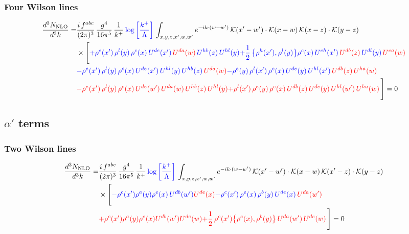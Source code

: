 \documentclass[9pt]{article}
\numberwithin{equation}{section}
\begin{document}
\subsubsection{Four Wilson lines}
\begin{align}
\frac{d^{3}N_{\rm NLO}}{d^{3}k} = &\frac{i\,f^{abc}}{(2\pi)^{3}}\,\frac{g^{4}}{16\pi^{5}}\,\frac{1}{k^{+}}\,{\color{blue}\log{\left[\frac{k^{+}}{\Lambda}\right]}}\,\int_{x,y,z,x',w,w'}e^{-ik\cdot (w-w')}\,\mathcal{K}(x'-w')\cdot\mathcal{K}(x-w)\,\mathcal{K}(x-z)\cdot\mathcal{K}(y-z)\notag\\
&\times\Bigg[{\color{blue}+\rho^{e}(x')\, \rho^{l}(y)\,\rho^{c}(x)\, U^{de}(x')\,{\color{red}U^{da}(w)}\,U^{hb}(z)\,U^{hl}(y)}{\color{blue}+\frac{1}{2}\,\big\{\rho^{h}(x'),\rho^{l}(y)\big\}\rho^{c}(x)\,U^{eh}(x')\,{\color{red}U^{db}(z)}\,U^{dl}(y)\,{\color{red}U^{ea}(w)}}\notag \\
&{\color{blue}-\rho^{e}(x')\,\rho^{l}(y)\,\rho^{c}(x)\,U^{de}(x')\,U^{hl}(y)\,U^{hb}(z)\,{\color{red}U^{da}(w)}}{\color{blue}-\rho^{e}(y)\,\rho^{l}(x')\,\rho^{c}(x)\,U^{de}(y)\,U^{hl}(x')\,{\color{red}U^{db}(z)}\,{\color{red}U^{ha}(w)}} \notag \\ &{\color{red}-\rho^{e}(x')\, \rho^{l}(y)\,\rho^{c}(x)\, U^{de}(w')\,{\color{red}U^{da}(w)}\,U^{hb}(z)\,U^{hl}(y)}{\color{red}+\rho^{l}(x')\,\rho^{e}(y)\,\rho^{c}(x)\,{\color{red}U^{db}(z)}\,U^{de}(y)\,U^{hl}(w')\,{\color{red}U^{ha}(w)}}\,\Bigg] = 0
\end{align}
\subsection{$\alpha'$ terms}
\subsubsection{Two Wilson lines}
\begin{align}
\frac{d^{3}N_{\rm NLO}}{d^{3}k}= & \frac{i\,f^{abc}}{(2\pi)^{3}}\,\frac{g^{4}}{16\pi^{5}}\,\frac{1}{k^{+}}\,{\color{blue}\log{\left[\frac{k^{+}}{\Lambda}\right]}}\,\int_{x,y,z,x',w,w'}e^{-ik\cdot (w-w')}\,\mathcal{K}(x'-w')\cdot\mathcal{K}(x-w)\,\mathcal{K}(x'-z)\cdot\mathcal{K}(y-z)\notag \\ & \times\Bigg[ {\color{blue}-\rho^{c}(x') \rho^{a}(y) \rho^{e}(x)\,U^{d b}(w') {\color{red}U^{de}(x)}}{\color{blue}-\rho^{c}(x')\,\rho^{e}(x)\,\rho^{b}(y)\,U^{de}(x)\,{\color{red}U^{da}(w')}}\notag \\
&{\color{red}+\rho^{c}(x') \rho^{a}(y) \rho^{e}(x) {\color{red}U^{db}(w')} {\color{red}U^{de}(w)}}{\color{red}+\frac{1}{2}\,\rho^{c}(x')\big\{\rho^{e}(x),\rho^{b}(y)\big\}\,{\color{red}U^{da}(w')}\,U^{de}(w)}\,\Bigg] = 0
\end{align}
\end{document}
